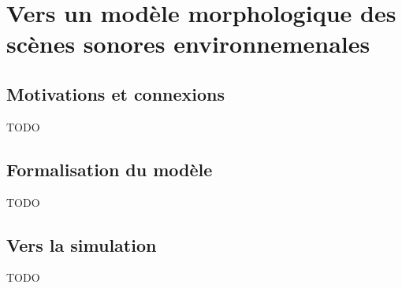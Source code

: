 \chapter{Vers un modèle morphologique des scènes sonores environnemenales}\label{ch:psycho_model} %

\section{Motivations et connexions}
TODO
\section{Formalisation du modèle}
TODO
\section{Vers la simulation}
TODO
